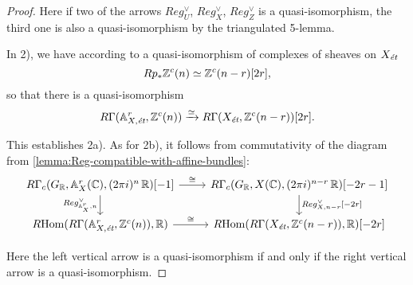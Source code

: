 \begin{proposition}
\begin{proof}
    Here if two of the arrows $Reg_U^\vee$, $Reg_X^\vee$, $Reg_Z^\vee$ is a
    quasi-isomorphism, the third one is also a quasi-isomorphism by the
    triangulated 5-lemma.

    In 2), we have according to \cite[Lemma 5.11]{Morin-14} a quasi-isomorphism
    of complexes of sheaves on $X_\text{\it ét}$
    $$Rp_* \mathbb{Z}^c (n) \simeq \mathbb{Z}^c (n-r) [2r],$$
    so that there is a quasi-isomorphism
    \begin{equation}
      \label{eqn:cohomology-of-Zc-on-ArX-and-X}
      R\Gamma (\mathbb{A}^r_{X,\text{\it ét}}, \mathbb{Z}^c (n))
      \xrightarrow{\simeq}
      R\Gamma (X_\text{\it ét}, \mathbb{Z}^c (n-r)) [2r].
    \end{equation}

    This establishes 2a). As for 2b), it follows from commutativity of the
    diagram from \ref{lemma:Reg-compatible-with-affine-bundles}:
    \[ \begin{tikzcd}
        R\Gamma_c (G_\RR, \AA^r_X (\CC), (2\pi i)^n\,\RR) [-1] \ar{r}{\isom}\ar{d}[swap]{Reg_{\AA^r_X,n}^\vee} & R\Gamma_c (G_\RR, X (\CC), (2\pi i)^{n-r}\,\RR) [-2r-1]\ar{d}{Reg_{X,n-r}^\vee [-2r]} \\
        \RHom (R\Gamma (\AA^r_{X,\text{\it ét}}, \ZZ^c (n)), \RR) \ar{r}{\isom} & \RHom (R\Gamma (X_\text{\it ét}, \ZZ^c (n-r)), \RR) [-2r]
      \end{tikzcd} \]

    Here the left vertical arrow is a quasi-isomorphism if and only if the right
    vertical arrow is a quasi-isomorphism.
  \end{proof}
\end{proposition}

